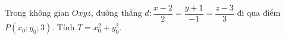 \begin{ex}
Trong không gian $Oxyz$, đường thẳng $d\colon\dfrac{x-2}{2}=\dfrac{y+1}{-1}=\dfrac{z-3}{3}$ đi qua điểm $P(x_0;y_0;3)$. Tính $T=x_0^2+y_0^2$.
\end{ex}
